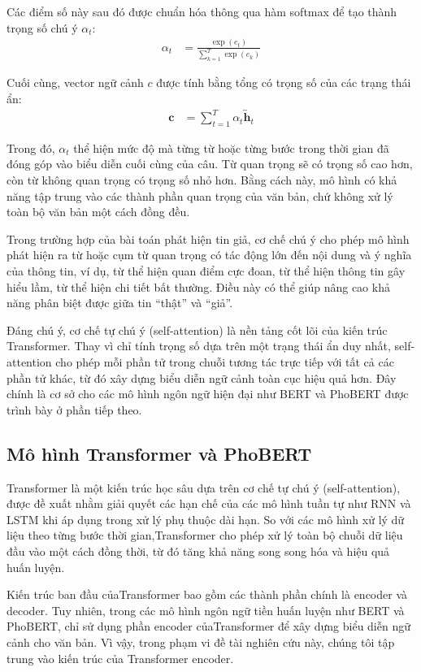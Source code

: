 \documentclass[12pt, a4paper]{report}
\begin{document}
Các điểm số này sau đó được chuẩn hóa thông qua hàm softmax để tạo thành trọng số chú ý $\alpha_t$:
\begin{align}
  \alpha_t &= \frac{\exp(e_t)}{\sum_{k=1}^{T} \exp(e_k)}
\end{align}

Cuối cùng, vector ngữ cảnh $c$ được tính bằng tổng có trọng số của các trạng thái ẩn:
\begin{align}
  \mathbf{c} &= \sum_{t=1}^{T} \alpha_t \overleftrightarrow{\mathbf{h}}_t
\end{align}

Trong đó, $\alpha_t$ thể hiện mức độ mà từng từ hoặc từng bước trong thời gian đã đóng góp vào biểu diễn cuối cùng của câu. Từ quan trọng sẽ có trọng số cao hơn, còn từ không quan trọng có trọng số nhỏ hơn. Bằng cách này, mô hình có khả năng tập trung vào các thành phần quan trọng của văn bản, chứ không xử lý toàn bộ văn bản một cách đồng đều.

Trong trường hợp của bài toán phát hiện tin giả, cơ chế chú ý cho phép mô hình phát hiện ra từ hoặc cụm từ quan trọng có tác động lớn đến nội dung và ý nghĩa của thông tin, ví dụ, từ thể hiện quan điểm cực đoan, từ thể hiện thông tin gây hiểu lầm, từ thể hiện chi tiết bất thường. Điều này có thể giúp nâng cao khả năng phân biệt được giữa tin ``thật'' và ``giả''.

Đáng chú ý, cơ chế tự chú ý (self-attention) là nền tảng cốt lõi của kiến trúc Transformer. Thay vì chỉ tính trọng số dựa trên một trạng thái ẩn duy nhất, self-attention cho phép mỗi phần tử trong chuỗi tương tác trực tiếp với tất cả các phần tử khác, từ đó xây dựng biểu diễn ngữ cảnh toàn cục hiệu quả hơn. Đây chính là cơ sở cho các mô hình ngôn ngữ hiện đại như BERT và PhoBERT được trình bày ở phần tiếp theo.

\subsection{Mô hình Transformer và PhoBERT}

Transformer là một kiến trúc học sâu dựa trên cơ chế tự chú ý (self-attention), được đề xuất nhằm giải quyết các hạn chế của các mô hình tuần tự như RNN và LSTM khi áp dụng trong xử lý phụ thuộc dài hạn. So với các mô hình xử lý dữ liệu theo từng bước thời gian,Transformer cho phép xử lý toàn bộ chuỗi dữ liệu đầu vào một cách đồng thời, từ đó tăng khả năng song song hóa và hiệu quả huấn luyện.

Kiến trúc ban đầu củaTransformer bao gồm các thành phần chính là encoder và decoder. Tuy nhiên, trong các mô hình ngôn ngữ tiền huấn luyện như BERT và PhoBERT, chỉ sử dụng phần encoder củaTransformer để xây dựng biểu diễn ngữ cảnh cho văn bản. Vì vậy, trong phạm vi đề tài nghiên cứu này, chúng tôi tập trung vào kiến trúc của Transformer encoder.
\end{document}
